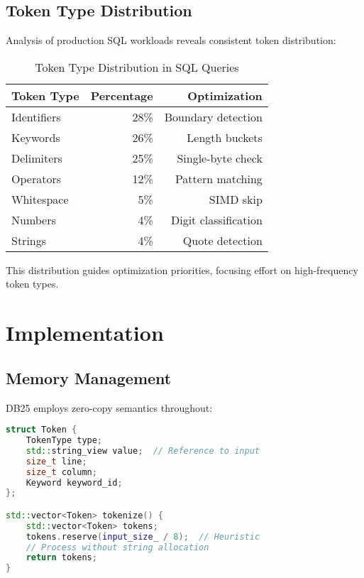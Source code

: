 \documentclass[conference]{IEEEtran}
\begin{document}
\subsection{Token Type Distribution}

Analysis of production SQL workloads reveals consistent token distribution:

\begin{table}[htbp]
\centering
\caption{Token Type Distribution in SQL Queries}
\label{tab:distribution}
\begin{tabular}{|l|r|r|}
\hline
\textbf{Token Type} & \textbf{Percentage} & \textbf{Optimization} \\
\hline
Identifiers & 28\% & Boundary detection \\
Keywords & 26\% & Length buckets \\
Delimiters & 25\% & Single-byte check \\
Operators & 12\% & Pattern matching \\
Whitespace & 5\% & SIMD skip \\
Numbers & 4\% & Digit classification \\
Strings & 4\% & Quote detection \\
\hline
\end{tabular}
\end{table}

This distribution guides optimization priorities, focusing effort on high-frequency token types.

\section{Implementation}

\subsection{Memory Management}

DB25 employs zero-copy semantics throughout:

\begin{lstlisting}[language=C++, basicstyle=\footnotesize]
struct Token {
    TokenType type;
    std::string_view value;  // Reference to input
    size_t line;
    size_t column;
    Keyword keyword_id;
};

std::vector<Token> tokenize() {
    std::vector<Token> tokens;
    tokens.reserve(input_size_ / 8);  // Heuristic
    // Process without string allocation
    return tokens;
}
\end{lstlisting}
\end{document}
